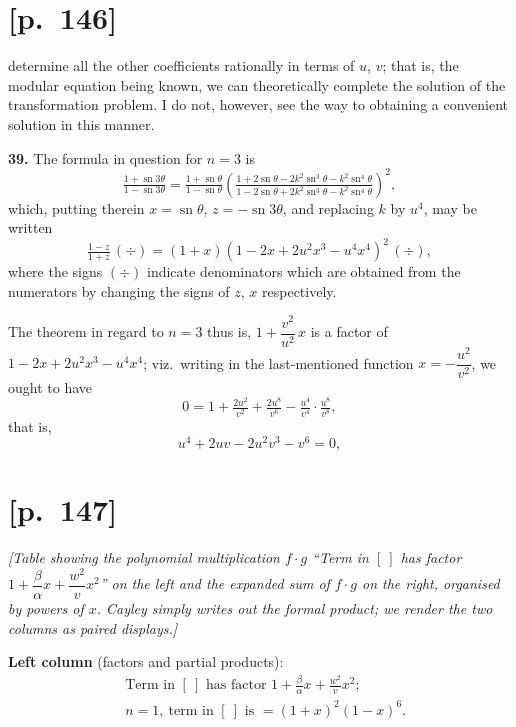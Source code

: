 \documentclass[11pt]{article}
\begin{document}
\section*{[p.~146]}
determine all the other coefficients rationally in terms of $u$, $v$; that is, the modular
equation being known, we can theoretically complete the solution of the transformation
problem. I do not, however, see the way to obtaining a convenient solution in this
manner.

\medskip
\noindent\textbf{39.} The formula in question for $n=3$ is
\[
\tfrac{1+\operatorname{sn}3\theta}{1-\operatorname{sn}3\theta}=\tfrac{1+\operatorname{sn}\theta}{1-\operatorname{sn}\theta}\!\left(\tfrac{1+2\operatorname{sn}\theta-2k^2\operatorname{sn}^3\theta-k^2\operatorname{sn}^4\theta}{1-2\operatorname{sn}\theta+2k^2\operatorname{sn}^3\theta-k^2\operatorname{sn}^4\theta}\right)^{\!2}\!,
\]
which, putting therein $x=\operatorname{sn}\theta$, $z=-\operatorname{sn}3\theta$, and replacing $k$ by $u^4$, may be written
\[
\tfrac{1-z}{1+z}\,(\div)=(1+x)(1-2x+2u^2x^3-u^4x^4)^2\,(\div),
\]
where the signs $(\div)$ indicate denominators which are obtained from the numerators by
changing the signs of $z$, $x$ respectively.

The theorem in regard to $n=3$ thus is, $1+\dfrac{v^2}{u^2}\,x$ is a factor of $1-2x+2u^2x^3-u^4x^4$;
viz.\ writing in the last-mentioned function $x=-\dfrac{u^2}{v^2}$, we ought to have
\[
0=1+\tfrac{2u^2}{v^2}+\tfrac{2u^8}{v^6}-\tfrac{u^4}{v^4}\cdot\tfrac{u^8}{v^8},
\]
that is,
\[
u^4+2uv-2u^2v^3-v^6=0,
\]

\section*{[p.~147]}
\noindent\textit{[Table showing the polynomial multiplication $f\cdot g$ ``Term in $[\ ]$ has factor $1+\dfrac{\beta}{\alpha}x+\dfrac{w^2}{v}x^2$'' on the left and the expanded sum of $f\cdot g$ on the right, organised by powers of $x$. Cayley simply writes out the formal product; we render the two columns as paired displays.]}

\noindent\textbf{Left column} (factors and partial products):
\[
\begin{aligned}
&\text{Term in }[\ ]\text{ has factor }1+\tfrac{\beta}{\alpha}x+\tfrac{w^2}{v}x^2;\\
&n=1,\ \text{term in }[\ ]\text{ is }=(1+x)^2(1-x)^6.
\end{aligned}
\]
\end{document}
